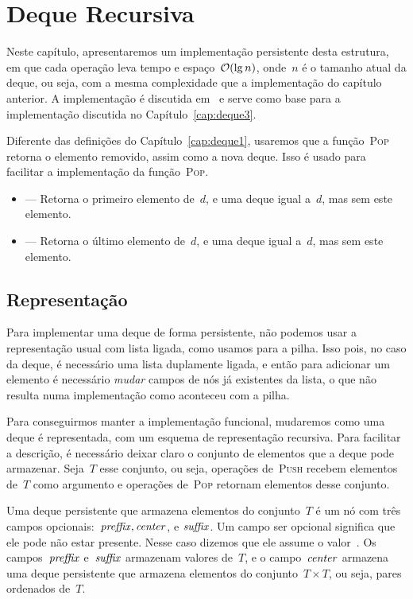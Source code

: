 \documentclass[../../main.tex]{subfiles}
\begin{document}
\chapter{Deque Recursiva} \label{cap:deque2}

Neste capítulo, apresentaremos um implementação persistente desta estrutura, em que cada operação leva tempo e espaço~$\mathcal{O}(\lg n)$, onde~$n$ é o tamanho atual da deque, ou seja, com a mesma complexidade que a implementação do capítulo anterior. A implementação é discutida em~\cite{Kaplan2001} e serve como base para a implementação discutida no Capítulo~\ref{cap:deque3}.

Diferente das definições do Capítulo~\ref{cap:deque1}, usaremos que a função~\textsc{Pop} retorna o elemento removido, assim como a nova deque. Isso é usado para facilitar a implementação da função~\textsc{Pop}.
\begin{itemize}
	\item {} --- Retorna o primeiro elemento de~$d$, e uma deque igual a~$d$, mas sem este elemento.
	\item {} --- Retorna o último elemento de~$d$, e uma deque igual a~$d$, mas sem este elemento.
\end{itemize}

\section{Representação}

Para implementar uma deque de forma persistente, não podemos usar a representação usual com lista ligada, como usamos para a pilha. Isso pois, no caso da deque, é necessário uma lista duplamente ligada, e então para adicionar um elemento é necessário \emph{mudar} campos de nós já existentes da lista, o que não resulta numa implementação como aconteceu com a pilha.

Para conseguirmos manter a implementação funcional, mudaremos como uma deque é representada, com um esquema de representação recursiva. Para facilitar a descrição, é necessário deixar claro o conjunto de elementos que a deque pode armazenar. Seja~$T$ esse conjunto, ou seja, operações de~\textsc{Push} recebem elementos de~$T$ como argumento e operações de~\textsc{Pop} retornam elementos desse conjunto.

Uma deque persistente que armazena elementos do conjunto~$T$ é um nó com três campos opcionais:~$\mathit{preffix}, \mathit{center}$, e $\mathit{suffix}$. Um campo ser opcional significa que ele pode não estar presente. Nesse caso dizemos que ele assume o valor~. Os campos~$\mathit{preffix}$ e~$\mathit{suffix}$ armazenam valores de~$T$, e o campo~$\mathit{center}$ armazena uma deque persistente que armazena elementos do conjunto~$T \times T$, ou seja, pares ordenados de~$T$.
\end{document}
